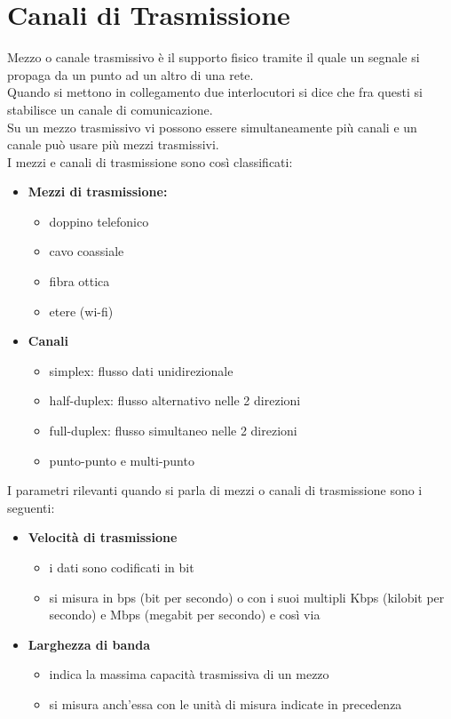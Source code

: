 \documentclass[a4paper]{report}
\begin{document}
\chapter{Canali di Trasmissione}
Mezzo o canale trasmissivo è il supporto fisico
tramite il quale un segnale si propaga da un
punto ad un altro di una rete.\\
Quando si mettono in collegamento due
interlocutori si dice che fra questi si stabilisce un
canale di comunicazione.\\
Su un mezzo trasmissivo vi possono essere
simultaneamente più canali e un canale può
usare più mezzi trasmissivi.\\
I mezzi e canali di trasmissione sono così classificati:
\begin{itemize}
\item \textbf{Mezzi di trasmissione:}
	\begin{itemize}
	\item doppino telefonico
	\item cavo coassiale
	\item fibra ottica
	\item etere (wi-fi)
	\end{itemize}
\item \textbf{Canali}
	\begin{itemize}
	\item simplex: flusso dati unidirezionale
	\item half-duplex: flusso alternativo nelle 2 direzioni
	\item full-duplex: flusso simultaneo nelle 2 direzioni
	\item punto-punto e multi-punto
	\end{itemize}
\end{itemize}
I parametri rilevanti quando si parla di mezzi o canali di trasmissione sono i seguenti:
\begin{itemize}
\item \textbf{Velocità di trasmissione}
	\begin{itemize}
	\item i dati sono codificati in bit
	\item si misura in bps (bit per secondo) o con i suoi multipli Kbps (kilobit per secondo) e Mbps (megabit per secondo) e così via
	\end{itemize}
\item \textbf{Larghezza di banda}
	\begin{itemize}
	\item indica la massima capacità trasmissiva di un mezzo
	\item si misura anch'essa con le unità di misura indicate in precedenza
	\end{itemize}
\end{itemize}
\end{document}
